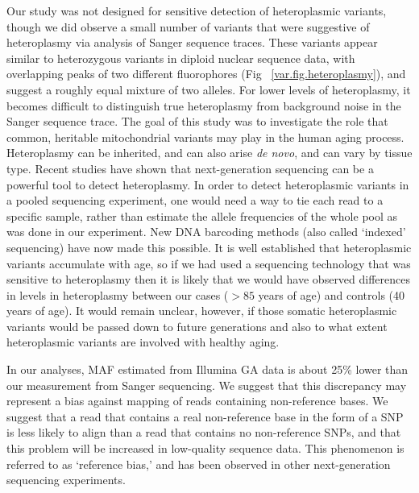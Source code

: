 Our study was not designed for sensitive detection of heteroplasmic variants, though we did observe a small number of variants that were suggestive of heteroplasmy via analysis of Sanger sequence traces.  These variants appear similar to heterozygous variants in diploid nuclear sequence data, with overlapping peaks of two different fluorophores (Fig ~\ref{var.fig.heteroplasmy}), and suggest a roughly equal mixture of two alleles.  For lower levels of heteroplasmy, it becomes difficult to distinguish true heteroplasmy from background noise in the Sanger sequence trace.  The goal of this study was to investigate the role that common, heritable mitochondrial variants may play in the human aging process.  Heteroplasmy can be inherited, and can also arise \textit{de novo}, and can vary by tissue type\cite{sondheimer2011neutral,coller2002frequent}.  Recent studies have shown that next-generation sequencing can be a powerful tool to detect heteroplasmy\cite{Li2010a}.  In order to detect heteroplasmic variants in a pooled sequencing experiment, one would need a way to tie each read to a specific sample, rather than estimate the allele frequencies of the whole pool as was done in our experiment.  New DNA barcoding methods (also called `indexed' sequencing) have now made this possible\cite{szelinger2011bar}.  It is well established that heteroplasmic variants accumulate with age\cite{sondheimer2011neutral,bender2006high,michikawa1999aging,calloway2000frequency}, so if we had used a sequencing technology that was sensitive to heteroplasmy then it is likely that we would have observed differences in levels in heteroplasmy between our cases ($> 85$ years of age) and controls (40 years of age).  It would remain unclear, however, if those somatic heteroplasmic variants would be passed down to future generations and also to what extent heteroplasmic variants are involved with healthy aging.

In our analyses, MAF estimated from Illumina GA data is about 25\% lower than our measurement from Sanger sequencing.  We suggest that this discrepancy may represent a bias against mapping of reads containing non-reference bases.  We suggest that a read that contains a real non-reference base in the form of a SNP is less likely to align than a read that contains no non-reference SNPs, and that this problem will be increased in low-quality sequence data.  This phenomenon is referred to as `reference bias,' and has been observed in other next-generation sequencing experiments\cite{degner2009effect}.

